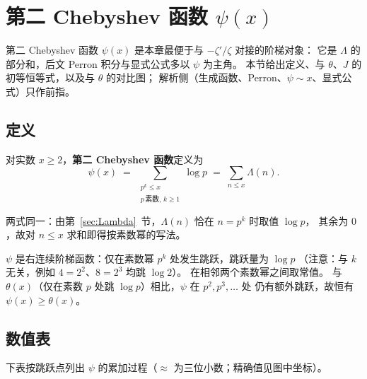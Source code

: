 \section{第二 Chebyshev 函数 \texorpdfstring{$\psi(x)$}{psi(x)}}\label{sec:second_chebyshev}

第二 Chebyshev 函数 $\psi(x)$ 是本章最便于与 $-\zeta'/\zeta$ 对接的阶梯对象：
它是 $\Lambda$ 的部分和，后文 Perron 积分与显式公式多以 $\psi$ 为主角。
本节给出定义、与 $\theta$、$J$ 的初等恒等式，以及与 $\theta$ 的对比图；
解析侧（生成函数、Perron、$\psi\sim x$、显式公式）只作前指。

\subsection{定义}
 
\begin{definition}{}{}
对实数 $x \geq 2$，\textbf{第二 Chebyshev 函数}定义为
\begin{equation}
  \psi(x)
  \;=\;
  \sum_{\substack{p^k \leq x \\ p\,\text{素数},\, k \geq 1}} \log p
  \;=\;
  \sum_{n \leq x} \Lambda(n).
\label{eq:psi_def}
\end{equation}
\end{definition}

两式同一：由第~\ref{sec:Lambda}~节，$\Lambda(n)$ 恰在 $n=p^k$ 时取值 $\log p$，
其余为 $0$，故对 $n\le x$ 求和即得按素数幂的写法。

$\psi$ 是右连续阶梯函数：仅在素数幂 $p^k$ 处发生跳跃，跳跃量为 $\log p$
（注意：与 $k$ 无关，例如 $4=2^2$、$8=2^3$ 均跳 $\log 2$）。
在相邻两个素数幂之间取常值。
与 $\theta(x)$（仅在素数 $p$ 处跳 $\log p$）相比，$\psi$ 在 $p^2,p^3,\ldots$ 处
仍有额外跳跃，故恒有 $\psi(x)\ge\theta(x)$。

\subsection{数值表}

下表按跳跃点列出 $\psi$ 的累加过程（$\approx$ 为三位小数；精确值见图中坐标）。

